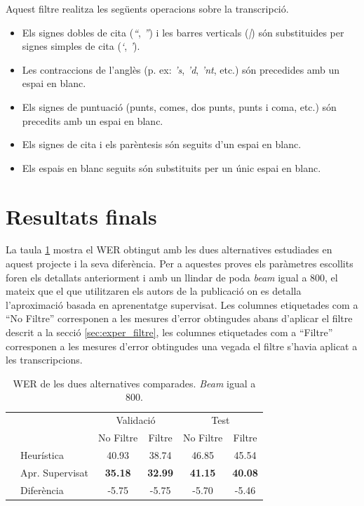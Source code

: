 Aquest filtre realitza les següents operacions sobre la transcripció.
\begin{itemize}
\item Els signes dobles de cita (\emph{``}, \emph{''}) i les barres verticals (\emph{|}) són substituides per signes simples de cita (\emph{`}, \emph{'}).
\item Les contraccions de l'anglès (p. ex: \emph{'s}, \emph{'d}, \emph{'nt}, etc.) són precedides amb un espai en blanc.
\item Els signes de puntuació (punts, comes, dos punts, punts i coma, etc.) són precedits amb un espai en blanc.
\item Els signes de cita i els parèntesis són seguits d'un espai en blanc.
\item Els espais en blanc seguits són substituits per un únic espai en blanc.
\end{itemize}

\section{Resultats finals}
La taula \ref{tab:comp_prhlt_elirf} mostra el WER obtingut amb les dues alternatives estudiades en aquest projecte i la seva diferència. Per a aquestes proves els paràmetres escollits foren els detallats anteriorment i amb un llindar de poda \emph{beam} igual a 800, el mateix que el que utilitzaren els autors de la publicació on es detalla \mbox{l'aproximació} basada en aprenentatge supervisat. Les columnes etiquetades com a ``No Filtre'' corresponen a les mesures d'error obtingudes abans d'aplicar el filtre descrit a la secció \ref{sec:exper_filtre}, les columnes etiquetades com a ``Filtre'' corresponen a les mesures d'error obtingudes una vegada el filtre s'havia aplicat a les transcripcions.\\

\begin{table}
\begin{center}
\begin{tabular}{ll|c|c|c|c|}
\cline{3-6} & & \multicolumn{2}{c|}{Validació} & \multicolumn{2}{c|}{Test}\\
\cline{3-6} & & No Filtre & Filtre & No Filtre & Filtre\\
\cline{1-6} \multicolumn{1}{|l}{} & Heurística & 40.93 & 38.74 & 46.85 & 45.54\\ 
\cline{1-6} \multicolumn{1}{|l}{} & Apr. Supervisat & \textbf{35.18} & \textbf{32.99} & \textbf{41.15} & \textbf{40.08}\\ 
\cline{1-6} \multicolumn{1}{|l}{} & Diferència & -5.75 & -5.75 & -5.70 & -5.46 \\ 
\hline 
\end{tabular} 
\caption{WER de les dues alternatives comparades. \emph{Beam} igual a 800.}\label{tab:comp_prhlt_elirf}
\end{center}
\end{table}

